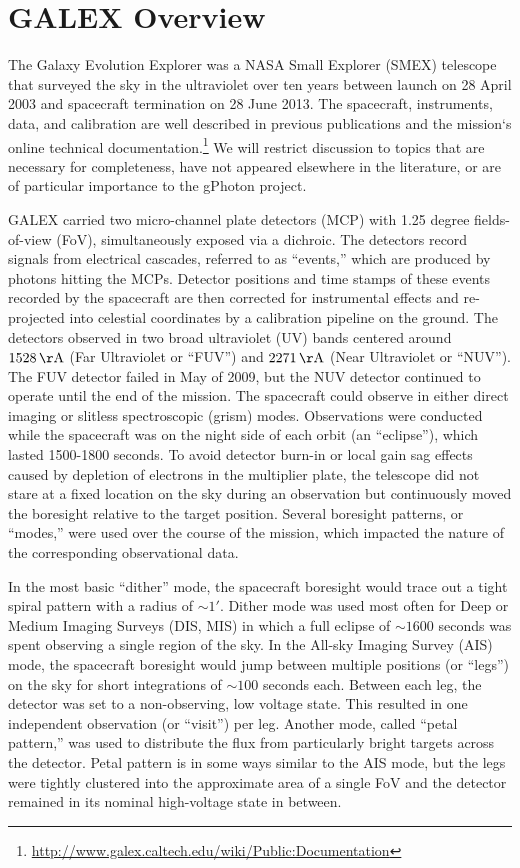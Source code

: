 \documentclass[preprint]{aastex}
\begin{document}
\section{GALEX Overview}
The Galaxy Evolution Explorer \citep{mar2005} was a NASA Small Explorer (SMEX) telescope that surveyed the sky in the ultraviolet over ten years between launch on 28 April 2003 and spacecraft termination on 28 June 2013. The spacecraft, instruments, data, and calibration are well described in previous publications \citep{mor2005,mor2007} and the mission`s online technical documentation.\footnote{\url{http://www.galex.caltech.edu/wiki/Public:Documentation}} We will restrict discussion to topics that are necessary for completeness, have not appeared elsewhere in the literature, or are of particular importance to the gPhoton project.

GALEX carried two micro-channel plate detectors (MCP) with 1.25 degree fields-of-view (FoV), simultaneously exposed via a dichroic. The detectors record signals from electrical cascades, referred to as ``events,'' which are produced by photons hitting the MCPs. Detector positions and time stamps of these events recorded by the spacecraft are then corrected for instrumental effects and re-projected into celestial coordinates by a calibration pipeline on the ground. The detectors observed in two broad ultraviolet (UV) bands centered around $1528\,\rm{\AA}$ (Far Ultraviolet or ``FUV'') and $2271\,\rm{\AA}$ (Near Ultraviolet or ``NUV''). The FUV detector failed in May of 2009, but the NUV detector continued to operate until the end of the mission. The spacecraft could observe in either direct imaging or slitless spectroscopic (grism) modes. Observations were conducted while the spacecraft was on the night side of each orbit (an ``eclipse''), which lasted 1500-1800 seconds. To avoid detector burn-in or local gain sag effects caused by depletion of electrons in the multiplier plate, the telescope did not stare at a fixed location on the sky during an observation but continuously moved the boresight relative to the target position. Several boresight patterns, or ``modes,'' were used over the course of the mission, which impacted the nature of the corresponding observational data.

In the most basic ``dither'' mode, the spacecraft boresight would trace out a tight spiral pattern with a radius of $\sim1'$. Dither mode was used most often for Deep or Medium Imaging Surveys (DIS, MIS) in which a full eclipse of $\sim1600$ seconds was spent observing a single region of the sky. In the All-sky Imaging Survey (AIS) mode, the spacecraft boresight would jump between multiple positions (or ``legs'') on the sky for short integrations of $\sim100$ seconds each. Between each leg, the detector was set to a non-observing, low voltage state. This resulted in one independent observation (or ``visit'') per leg. Another mode, called ``petal pattern,'' was used to distribute the flux from particularly bright targets across the detector. Petal pattern is in some ways similar to the AIS mode, but the legs were tightly clustered into the approximate area of a single FoV and the detector remained in its nominal high-voltage state in between.
\end{document}
